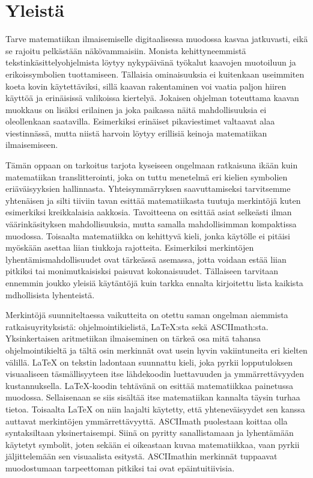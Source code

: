 \section{Yleistä}
Tarve matematiikan ilmaisemiselle digitaalisessa muodossa kasvaa jatkuvasti, eikä se rajoitu pelkästään näkövammaisiin.
Monista kehittyneemmistä tekstinkäsittelyohjelmista löytyy nykypäivänä työkalut kaavojen muotoiluun ja erikoissymbolien tuottamiseen.
Tällaisia ominaisuuksia ei kuitenkaan useimmiten koeta kovin käytettäviksi, sillä kaavan rakentaminen voi vaatia paljon hiiren käyttöä ja erinäisissä valikoissa 
kiertelyä.
Jokaisen ohjelman toteuttama kaavan muokkaus on lisäksi erilainen ja joka paikassa näitä mahdollisuuksia ei oleollenkaan saatavilla.
Esimerkiksi erinäiset pikaviestimet valtaavat alaa viestinnässä, mutta niistä harvoin löytyy erillisiä keinoja matematiikan ilmaisemiseen.


Tämän oppaan on tarkoitus tarjota kyseiseen ongelmaan ratkaisuna ikään kuin matematiikan translitterointi, joka on tuttu menetelmä eri kielien symbolien 
eriäväisyyksien hallinnasta.
Yhteisymmärryksen saavuttamiseksi tarvitsemme yhtenäisen ja silti tiiviin tavan esittää matematiikasta tuutuja merkintöjä kuten esimerkiksi kreikkalaisia aakkosia.
Tavoitteena on esittää asiat selkeästi ilman väärinkäsityksen mahdollisuuksia, mutta samalla mahdollisimman kompaktissa muodossa.
Toisaalta matematiikka on kehittyvä kieli, jonka käytölle ei pitäisi myöskään asettaa liian tiukkoja rajotteita.
Esimerkiksi merkintöjen lyhentämismahdollisuudet ovat tärkeässä asemassa, jotta voidaan estää liian pitkiksi tai monimutkaisisksi paisuvat kokonaisuudet.
Tällaiseen tarvitaan ennemmin joukko yleisiä käytäntöjä kuin tarkka ennalta kirjoitettu lista kaikista mdhollisista lyhenteistä.

Merkintöjä suunniteltaessa vaikutteita on otettu saman ongelman aiemmista ratkaisuyrityksistä: ohjelmointikielistä, LaTeX:sta sekä ASCIImath:sta.
Yksinkertaisen aritmetiikan ilmaiseminen on tärkeä osa mitä tahansa ohjelmointikieltä ja tältä osin merkinnät ovat usein hyvin vakiintuneita eri kielten välillä.
LaTeX on tekstin ladontaan suunnattu kieli, joka pyrkii lopputuloksen visuaaliseen täsmällisyyteen itse lähdekoodin luettavuuden ja ymmärrettävyyden 
kustannuksella.
LaTeX-koodin tehtävänä on esittää matematiikkaa painetussa muodossa. Sellaisenaan se siis sisältää itse matematiikan kannalta täysin turhaa tietoa.
Toisaalta LaTeX on niin laajalti käytetty, että yhteneväisyydet sen kanssa auttavat merkintöjen ymmärrettävyyttä.
ASCIImath puolestaan koittaa olla syntaksiltaan yksinertaisempi.
Siinä on pyritty sanallistamaan ja lyhentämään käytetyt symbolit, joten sekään 
ei oikeastaan kuvaa matematiikkaa, vaan pyrkii jäljittelemään sen visuaalista esitystä.
ASCIImathin merkinnät tuppaavat muodostumaan tarpeettoman pitkiksi tai ovat epäintuitiivisia.

